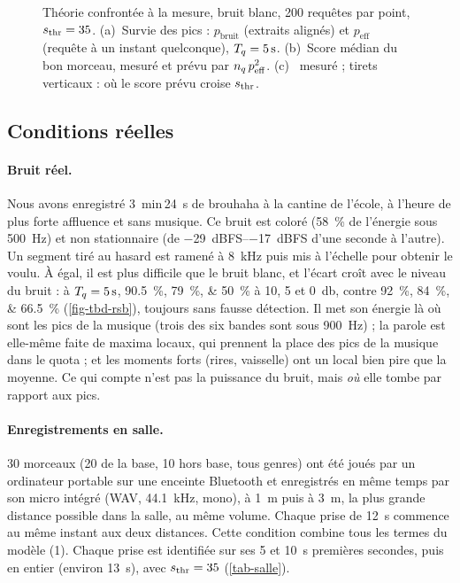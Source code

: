 \begin{figure}[t]
  \centering
  \caption{Théorie confrontée à la mesure, bruit blanc, 200 requêtes par point,
  $s_{\mathrm{thr}} = 35$. (a)~Survie des pics : $p_{\text{bruit}}$ (extraits alignés) et
  $p_{\text{eff}}$ (requête à un instant quelconque), $T_q = \qty{5}{\second}$.
  (b)~Score médian du bon morceau, mesuré et prévu par $n_q\,p_{\text{eff}}^2$.
  (c)~\TBD{} mesuré ; tirets verticaux : \RSB{} où le score prévu croise $s_{\mathrm{thr}}$.}
  \label{fig-theorie-mesure}
\end{figure}

\subsection{Conditions réelles}
\label{sec-reel}

\paragraph{Bruit réel.} Nous avons enregistré \qty{3}{\minute}\,\qty{24}{\second} de
brouhaha à la cantine de l'école, à l'heure de plus forte affluence et sans musique. Ce bruit
est coloré (\qty{58}{\percent} de l'énergie sous \qty{500}{\hertz}) et non stationnaire (de
\qtyrange{-29}{-17}{dBFS} d'une seconde à l'autre). Un segment tiré au hasard est ramené à
\qty{8}{\kilo\hertz} puis mis à l'échelle pour obtenir le \RSB{} voulu. À \RSB{} égal, il est
plus difficile que le bruit blanc, et l'écart croît avec le niveau du bruit : à
$T_q = \qty{5}{\second}$, \qtylist{90.5;79;50}{\percent} à 10, 5 et \qty{0}{\decibel}, contre
\qtylist{92;84;66.5}{\percent} (\cref{fig-tbd-rsb}), toujours sans fausse détection. Il met son
énergie là où sont les pics de la musique (trois des six bandes sont sous
\qty{900}{\hertz}) ; la parole est elle-même faite de maxima locaux, qui prennent la place des
pics de la musique dans le quota ; et les moments forts (rires, vaisselle) ont un \RSB{} local
bien pire que la moyenne. Ce qui compte n'est pas la puissance du bruit, mais \emph{où} elle
tombe par rapport aux pics.

\paragraph{Enregistrements en salle.} 30 morceaux (20 de la base, 10 hors base, tous genres)
ont été joués par un ordinateur portable sur une enceinte Bluetooth
 et enregistrés en même temps par son
micro intégré (WAV, \qty{44.1}{\kilo\hertz}, mono), à \qty{1}{\metre} puis à \qty{3}{\metre},
la plus grande distance possible dans la salle, au même volume. Chaque prise de
\qty{12}{\second} commence au même instant aux deux distances. Cette condition combine tous
les termes du modèle (1). Chaque prise est identifiée sur ses 5 et \qty{10}{\second}
premières secondes, puis en entier (environ \qty{13}{\second}), avec $s_{\mathrm{thr}} = 35$
(\cref{tab-salle}).

